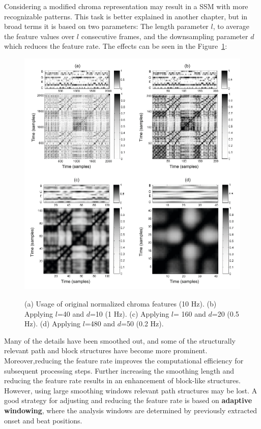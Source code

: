 \documentclass[a4paper, 9pt, twocolumn]{extarticle}
\begin{document}
Considering a modified chroma representation may result in a SSM with more recognizable patterns. This task is better explained in another chapter, but in broad terms it is based on two parameters: The length parameter $l$, to average the feature values over $l$ consecutive frames, and the downsampling parameter $d$ which reduces the feature rate. The effects can be seen in the Figure~\ref{fig:ssmDownsampling}:


\begin{figure}[h!]
  \includegraphics[width=\linewidth]{images/ssmDownsampling.png}
  \label{fig:ssmDownsampling}
	\begin{center}
		\caption{(a) Usage of original normalized chroma features (10 Hz). (b) Applying $l$=40 and $d$=10 (1 Hz). (c) Applying $l$= 160 and $d$=20 (0.5 Hz). (d) Applying $l$=480 and $d$=50 (0.2 Hz).}
	\end{center}
\end{figure}


Many of the details have been smoothed out, and some
of the structurally relevant path and block structures have become more prominent. Moreover,reducing the feature rate improves the computational efficiency for subsequent processing steps. Further increasing the smoothing length and reducing the feature rate results in an enhancement of block-like structures. However, using large smoothing windows relevant path structures may be lost. A good strategy for adjusting and reducing the feature rate is based on \textbf{adaptive windowing}, where the analysis windows are determined by previously extracted onset
and beat positions. 
\end{document}
